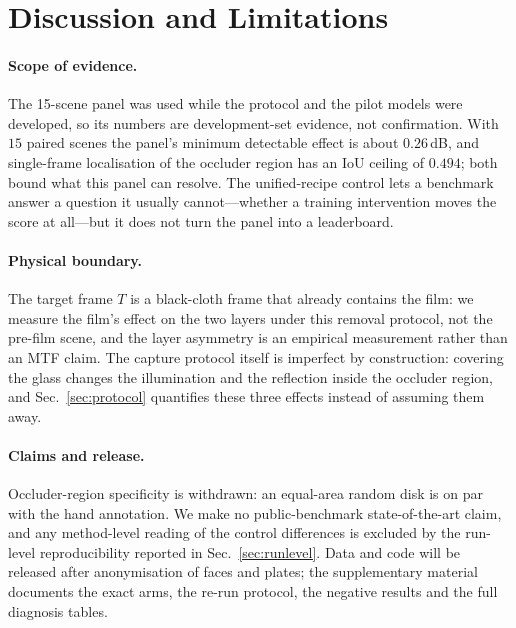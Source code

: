 \section{Discussion and Limitations}
\label{sec:discussion}

\paragraph{Scope of evidence.} The 15-scene panel was used while the protocol
and the pilot models were developed, so its numbers are development-set
evidence, not confirmation. With $15$ paired scenes the panel's minimum
detectable effect is about $0.26$\,dB, and single-frame localisation of the
occluder region has an IoU ceiling of $0.494$; both bound what this panel can
resolve. The unified-recipe control lets a benchmark answer a question it
usually cannot---whether a training intervention moves the score at all---but
it does not turn the panel into a leaderboard.

\paragraph{Physical boundary.} The target frame $T$ is a black-cloth frame that
already contains the film: we measure the film's effect on the two layers under
this removal protocol, not the pre-film scene, and the layer asymmetry is an
empirical measurement rather than an MTF claim. The capture protocol itself is
imperfect by construction: covering the glass changes the illumination and the
reflection inside the occluder region, and Sec.~\ref{sec:protocol} quantifies
these three effects instead of assuming them away.

\paragraph{Claims and release.} Occluder-region specificity is withdrawn: an
equal-area random disk is on par with the hand annotation. We make no
public-benchmark state-of-the-art claim, and any method-level reading of the
control differences is excluded by the run-level reproducibility reported in
Sec.~\ref{sec:runlevel}. Data and code will be released after anonymisation of
faces and plates; the supplementary material documents the exact arms, the
re-run protocol, the negative results and the full diagnosis tables.
